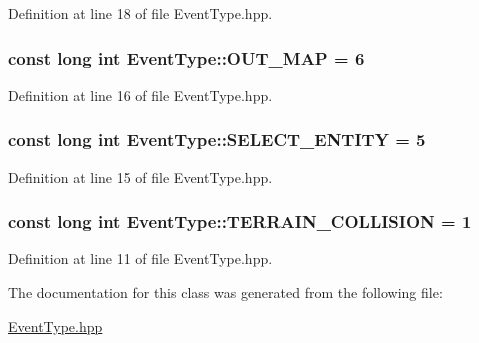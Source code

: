 Definition at line 18 of file Event\+Type.\+hpp.

\hypertarget{class_event_type_a39f91c1453a4c17e084d222006b91ccf}{
\subsubsection[{O\+U\+T\+\_\+\+M\+A\+P}]{\setlength{\rightskip}{0pt plus 5cm}const long int Event\+Type\+::\+O\+U\+T\+\_\+\+M\+A\+P = 6\hspace{0.3cm}{\ttfamily [static]}}}\label{class_event_type_a39f91c1453a4c17e084d222006b91ccf}


Definition at line 16 of file Event\+Type.\+hpp.

\hypertarget{class_event_type_ade218fb495bba6510f0c186034c55f4f}{
\subsubsection[{S\+E\+L\+E\+C\+T\+\_\+\+E\+N\+T\+I\+T\+Y}]{\setlength{\rightskip}{0pt plus 5cm}const long int Event\+Type\+::\+S\+E\+L\+E\+C\+T\+\_\+\+E\+N\+T\+I\+T\+Y = 5\hspace{0.3cm}{\ttfamily [static]}}}\label{class_event_type_ade218fb495bba6510f0c186034c55f4f}


Definition at line 15 of file Event\+Type.\+hpp.

\hypertarget{class_event_type_a2e116fdf98748616b8dd518caefba94d}{
\subsubsection[{T\+E\+R\+R\+A\+I\+N\+\_\+\+C\+O\+L\+L\+I\+S\+I\+O\+N}]{\setlength{\rightskip}{0pt plus 5cm}const long int Event\+Type\+::\+T\+E\+R\+R\+A\+I\+N\+\_\+\+C\+O\+L\+L\+I\+S\+I\+O\+N = 1\hspace{0.3cm}{\ttfamily [static]}}}\label{class_event_type_a2e116fdf98748616b8dd518caefba94d}


Definition at line 11 of file Event\+Type.\+hpp.



The documentation for this class was generated from the following file\+:\begin{DoxyCompactItemize}
\item 
\hyperlink{_event_type_8hpp}{Event\+Type.\+hpp}\end{DoxyCompactItemize}
